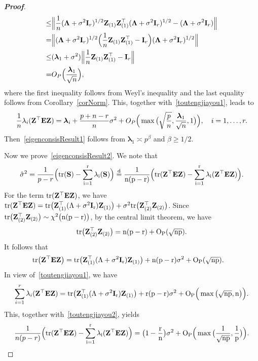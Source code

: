 \documentclass[times,sort&compress,3p]{elsarticle}
\newcommand{\mytr}{\rm tr}
\newcommand{\bZ}{\mathbf{Z}}
\newcommand{\bfsym}[1]{\ensuremath{\boldsymbol{#1}}}
\def\blambda {\bfsym {\lambda}}        \def\bLambda {\bfsym {\Lambda}}
\theoremstyle{plain}
\theoremstyle{definition}
\theoremstyle{remark}
\begin{document}
\begin{appendices}
\begin{proof}[\textbf{Proof}]
$$\begin{aligned}
        \leq &
        \Big\|
        \frac{1}{n}(\bLambda+\sigma^2 \BI_r)^{1/2}\bZ_{(1)}\bZ_{(1)}^\top (\bLambda+\sigma^2 \BI_r)^{1/2}
        -(\bLambda+\sigma^2 \BI_r)
        \Big\|\\
        = &
        \Big\|
        (\bLambda+\sigma^2 \BI_r)^{1/2}\Big(\frac{1}{n}\bZ_{(1)}\bZ_{(1)}^\top -\BI_r\Big)(\bLambda+\sigma^2 \BI_r)^{1/2}
        \Big\|\\
        \leq &
        (\blambda_1 + \sigma^2)
        \Big\|\frac{1}{n}\bZ_{(1)}\bZ_{(1)}^\top -\BI_r\Big\|\\
        = &
        O_P\Big(\frac{\blambda_1}{\sqrt{n}}\Big),
    \end{aligned}
    $$
    where the first inequality follows from Weyl's inequality and the last equality follows from Corollary~\ref{corNorm}.
    This, together with~\eqref{toutengjiayou1}, leads to
$$
\frac{1}{n}\lambda_i(\BZ^\top  \BE \BZ)=
\blambda_i+\frac{p+n-r}{n}\sigma^2+O_P\Big(\max\big(\sqrt{\frac{p}{n}},\frac{\blambda_1}{\sqrt{n}},1\big)\Big),\quad i=1,\ldots, r.
$$
Then~\eqref{eigenconsisResult1} follows from $\blambda_1\asymp p^{\beta}$ and $\beta\geq 1/2$.
    
    Now we prove~\eqref{eigenconsisResult2}.
    We note that
    $$
    \hat{\sigma}^2=\frac{1}{p-r}\Big(\mytr(\BS)-\sum_{i=1}^r \lambda_i(\BS)\Big)
    \overset{d}{=}
\frac{1}{n(p-r)}\Big(\mytr(\BZ^\top  \BE \BZ)-\sum_{i=1}^r \lambda_i(\BZ^\top  \BE \BZ)\Big).
    $$
    For the term $\mytr(\BZ^\top  \BE \BZ)$, we have
    $
            \mytr(\bZ^\top  \BE \bZ)= \mytr\big(\bZ_{(1)}^\top  (\bLambda +\sigma^2 \BI_r) \bZ_{(1)}\big)+
       \sigma^2 \mytr\big( \bZ_{(2)}^\top   \bZ_{(2)}\big)
    $.
    Since $\mytr\big( \bZ_{(2)}^\top   \bZ_{(2)}\big)\sim \chi^2\big( n(p-r)\big)$, by the central limit theorem, we have
    $$\mytr\big( \bZ_{(2)}^\top   \bZ_{(2)}\big)=n(p-r)+O_P(\sqrt{np}).$$
    It follows that
    \begin{equation}\label{toutengjiayou2}
        \begin{aligned}
            \mytr\big(\bZ^\top  \BE \bZ\big)&= \mytr\big(\bZ_{(1)}^\top  (\bLambda +\sigma^2 \BI_r) \bZ_{(1)}\big)+
            n(p-r)\sigma^2+O_P(\sqrt{np}).
        \end{aligned}
    \end{equation}
    In view of~\eqref{toutengjiayou1}, we have
    $$
\sum_{i=1}^r\lambda_i(\BZ^\top  \BE \BZ)
=\mytr\big(\BZ_{(1)}^\top  (\bLambda+\sigma^2 \BI_r)\BZ_{(1)}\big)
+r(p-r)\sigma^2
+
O_P\Big(\max\big(\sqrt{np},n\big)\Big).
    $$
    This, together with~\eqref{toutengjiayou2}, yields
    $$
\frac{1}{n(p-r)}\Big(\mytr(\BZ^\top  \BE \BZ)-\sum_{i=1}^r \lambda_i(\BZ^\top  \BE \BZ)\Big)=
\big(1-\frac{r}{n}\big)\sigma^2+
O_P\Big(\max\big(\frac{1}{\sqrt{np}},\frac{1}{p}\big)\Big).
    $$
\end{proof}


\end{appendices}
\end{document}
